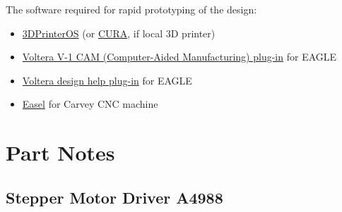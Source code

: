 \documentclass[12pt]{article}
\begin{document}
The software required for rapid prototyping of the design:
\begin{itemize}
	\item \href{www.3dprinteros.com}{3DPrinterOS} (or \href{https://ultimaker.com/en/products/ultimaker-cura-software}{CURA}, if local 3D printer)
	\item \href{https://support.voltera.io/hc/en-us/articles/115002633033-EAGLE-Export-Guide}{Voltera V-1 CAM (Computer-Aided Manufacturing) plug-in} for EAGLE
	\item \href{https://support.voltera.io/hc/en-us/articles/115002633033-EAGLE-Export-Guide}{Voltera design help plug-in} for EAGLE
	\item \href{https://www.inventables.com/technologies/easel}{Easel} for Carvey CNC machine 
\end{itemize}

\section{Part Notes}

\subsection{Stepper Motor Driver A4988}
\end{document}
